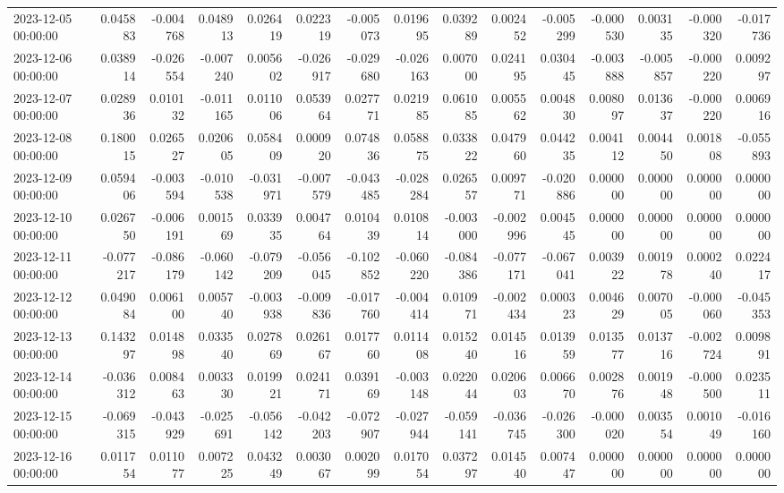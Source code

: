 \begin{tabular}{lrrrrrrrrrrrrrr}
2023-12-05 00:00:00 & 0.045883 & -0.004768 & 0.048913 & 0.026419 & 0.022319 & -0.005073 & 0.019695 & 0.039289 & 0.002452 & -0.005299 & -0.000530 & 0.003135 & -0.000320 & -0.017736 \\
2023-12-06 00:00:00 & 0.038914 & -0.026554 & -0.007240 & 0.005602 & -0.026917 & -0.029680 & -0.026163 & 0.007000 & 0.024195 & 0.030445 & -0.003888 & -0.005857 & -0.000220 & 0.009297 \\
2023-12-07 00:00:00 & 0.028936 & 0.010132 & -0.011165 & 0.011006 & 0.053964 & 0.027771 & 0.021985 & 0.061085 & 0.005562 & 0.004830 & 0.008097 & 0.013637 & -0.000220 & 0.006916 \\
2023-12-08 00:00:00 & 0.180015 & 0.026527 & 0.020605 & 0.058409 & 0.000920 & 0.074836 & 0.058875 & 0.033822 & 0.047960 & 0.044235 & 0.004112 & 0.004450 & 0.001808 & -0.055893 \\
2023-12-09 00:00:00 & 0.059406 & -0.003594 & -0.010538 & -0.031971 & -0.007579 & -0.043485 & -0.028284 & 0.026557 & 0.009771 & -0.020886 & 0.000000 & 0.000000 & 0.000000 & 0.000000 \\
2023-12-10 00:00:00 & 0.026750 & -0.006191 & 0.001569 & 0.033935 & 0.004764 & 0.010439 & 0.010814 & -0.003000 & -0.002996 & 0.004545 & 0.000000 & 0.000000 & 0.000000 & 0.000000 \\
2023-12-11 00:00:00 & -0.077217 & -0.086179 & -0.060142 & -0.079209 & -0.056045 & -0.102852 & -0.060220 & -0.084386 & -0.077171 & -0.067041 & 0.003922 & 0.001978 & 0.000240 & 0.022417 \\
2023-12-12 00:00:00 & 0.049084 & 0.006100 & 0.005740 & -0.003938 & -0.009836 & -0.017760 & -0.004414 & 0.010971 & -0.002434 & 0.000323 & 0.004629 & 0.007005 & -0.000060 & -0.045353 \\
2023-12-13 00:00:00 & 0.143297 & 0.014898 & 0.033540 & 0.027869 & 0.026167 & 0.017760 & 0.011408 & 0.015240 & 0.014516 & 0.013959 & 0.013577 & 0.013716 & -0.002724 & 0.009891 \\
2023-12-14 00:00:00 & -0.036312 & 0.008463 & 0.003330 & 0.019921 & 0.024171 & 0.039169 & -0.003148 & 0.022044 & 0.020603 & 0.006670 & 0.002876 & 0.001948 & -0.000500 & 0.023511 \\
2023-12-15 00:00:00 & -0.069315 & -0.043929 & -0.025691 & -0.056142 & -0.042203 & -0.072907 & -0.027944 & -0.059141 & -0.036745 & -0.026300 & -0.000020 & 0.003554 & 0.001049 & -0.016160 \\
2023-12-16 00:00:00 & 0.011754 & 0.011077 & 0.007225 & 0.043249 & 0.003067 & 0.002099 & 0.017054 & 0.037297 & 0.014540 & 0.007447 & 0.000000 & 0.000000 & 0.000000 & 0.000000 \\

\end{tabular}
